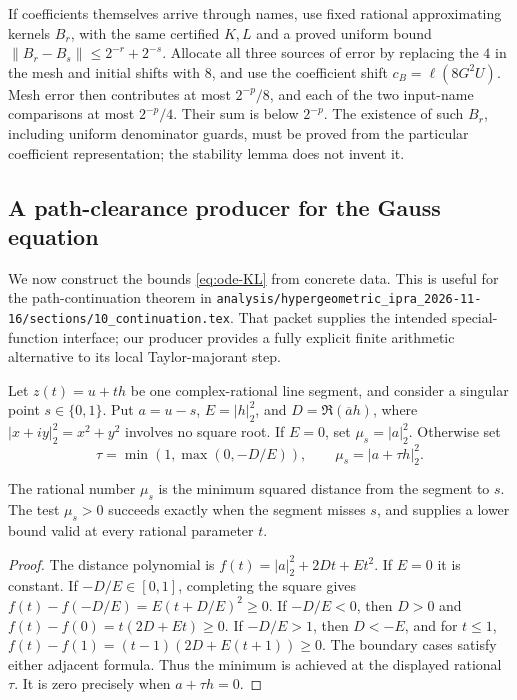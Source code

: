 If coefficients themselves arrive through names, use fixed rational
approximating kernels $B_r$, with the same certified $K,L$ and a proved
uniform bound
$\lVert B_r-B_s\rVert\le2^{-r}+2^{-s}$. Allocate all three sources of
error by replacing the $4$ in the mesh and initial shifts with $8$, and
use the coefficient shift $c_B=\ell(8G^2U)$. Mesh error then contributes
at most $2^{-p}/8$, and each of the two input-name comparisons at most
$2^{-p}/4$. Their sum is below $2^{-p}$. The existence of such $B_r$,
including uniform denominator guards, must be proved from the particular
coefficient representation; the stability lemma does not invent it.

\subsection{A path-clearance producer for the Gauss equation}

We now construct the bounds \eqref{eq:ode-KL} from concrete data. This is
useful for the path-continuation theorem in
\texttt{analysis/hypergeometric\_ipra\_2026-11-16/sections/10\_continuation.tex}.
That packet supplies the intended special-function interface; our producer
provides a fully explicit finite arithmetic alternative to its local
Taylor-majorant step.

Let $z(t)=u+th$ be one complex-rational line segment, and consider a singular
point $s\in\{0,1\}$. Put $a=u-s$, $E=|h|_2^2$, and
$D=\Re(\overline a h)$, where $|x+iy|_2^2=x^2+y^2$ involves no square
root. If $E=0$, set $\mu_s=|a|_2^2$. Otherwise set
\[
 \tau=\min(1,\max(0,-D/E)),\qquad
 \mu_s=|a+\tau h|_2^2.
\]

\begin{lemma}\label{lem:ode-clearance}
The rational number $\mu_s$ is the minimum squared distance from the
segment to $s$. The test $\mu_s>0$ succeeds exactly when the segment misses
$s$, and supplies a lower bound valid at every rational parameter $t$.
\end{lemma}
\begin{proof}
The distance polynomial is $f(t)=|a|_2^2+2Dt+Et^2$. If $E=0$ it is constant.
If $-D/E\in[0,1]$, completing the square gives
$f(t)-f(-D/E)=E(t+D/E)^2\ge0$. If $-D/E<0$, then $D>0$ and
$f(t)-f(0)=t(2D+Et)\ge0$. If $-D/E>1$, then $D<-E$, and for $t\le1$,
$f(t)-f(1)=(t-1)(2D+E(t+1))\ge0$. The boundary cases satisfy either
adjacent formula. Thus the minimum is achieved at the displayed rational
$\tau$. It is zero precisely when $a+\tau h=0$.
\end{proof}

